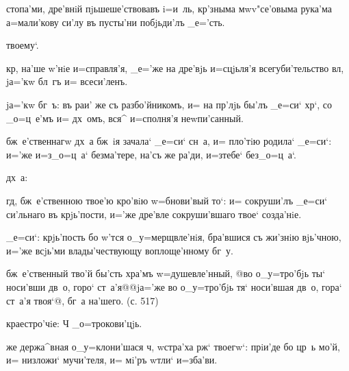 

стопа'ми, дре'внiй пjьшеше'ствовавъ i=и~ль, 
кр'зныма мwv"се'овыма рука'ма а=мали'кову си'лу 
въ пусты'ни побjьди'лъ _е='сть.

твоему`.

кр, на'ше w'нiе и=справля'я, _е='же на 
дре'вjь и=сцjьля'я всегуби'тельство вл, jа='кw бл~гъ 
и= всеси'ленъ.

jа='кw бг~ъ: въ раи' же съ разбо'йникомъ, и= на 
пр'лjь бы'лъ _е=си` хр`, со _о=ц~е'мъ и= дх~омъ, 
вся^ и=сполня'я неwпи'санный.

бж~е'ственнагw дх~а бж~iя зачала` _е=си` сн~а, и= пло'тiю 
родила` _е=си`: и='же и=з\ъ _о=ц~а` без\ъ ма'тере, на'съ 
же ра'ди, и=з\ъ тебе` без\ъ _о=ц~а`.



дх~а:

гд, бж~е'ственною твое'ю кро'вiю w=бнови'вый то`: и= 
сокруши'лъ _е=си` си'льнаго въ крjь'пости, и='же дре'вле 
сокруши'вшаго твое` созда'нiе.

_е=си`: крjь'пость бо w'тся о_у=мерщвле'нiя, бра'вшися 
съ жи'знiю вjь'чною, и='же всjь'ми влады'чествующу 
воплоще'нному бг~у.

бж~е'ственный тво'й бы'сть хра'мъ w=душевле'нный, @во 
о_у=тро'бjь ты` носи'вши дв~о, горо` ст~а'я@{@jа='же во 
о_у=тро'бjь тя` носи'вшая дв~о, гора` ст~а'я твоя`@}, 
бг~а на'шего. (с. 517)

краестро'чiе: Ч%
_о=трокови'цjь.%



же держа^вная о_у=клони'шася ч, w\т стра'ха рж` 
твоегw`: прiи'де бо цр~ь мо'й, и= низложи` мучи'теля, и= 
мi'ръ w\т тли` и=зба'ви.


